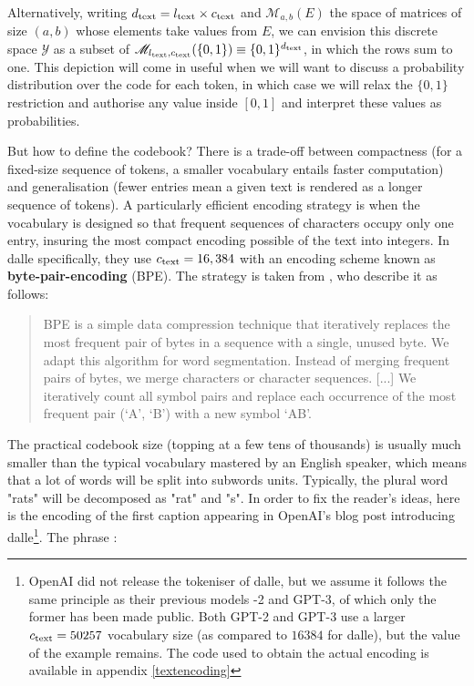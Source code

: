 \documentclass{article}
\begin{document}
\begin{multicols}{2}
Alternatively, writing ${d_{\mathrm{text}}} = {l_{\mathrm{text}}} \times {c_{\mathrm{text}}}$ and $\mathscr{M}_{a,b}(E)$ the space of matrices of size $(a,b)$ whose elements take values from $E$, we can envision this discrete space $\mathcal{Y}$ as a subset of $\mathscr{M}_{{l_{\mathrm{text}}},{c_{\mathrm{text}}}}(\{0,1\})\equiv \{0,1\}^{d_{\mathrm{text}}}$, in which the rows sum to one.
This depiction will come in useful when we will want to discuss a probability distribution over the code for each token, in which case we will relax the $\{0,1\}$ restriction and authorise any value inside $[0,1]$ and interpret these values as probabilities.

But how to define the codebook?
There is a trade-off between compactness (for a fixed-size sequence of tokens, a smaller vocabulary entails faster computation) and generalisation (fewer entries mean a given text is rendered as a longer sequence of tokens).
A particularly efficient encoding strategy is when the vocabulary is designed so that frequent sequences of characters occupy only one entry, insuring the most compact encoding possible of the text into integers.
In \gls{dalle} specifically, they use ${c_{\mathrm{text}}}=16,384$ with an encoding scheme known as \textbf{byte-pair-encoding} (BPE). The strategy is taken from \citet{subword-units}, who describe it as follows:

\blockquote{
BPE is a simple data compression technique that iteratively replaces the most frequent pair of bytes in a sequence with a single, unused byte.
We adapt this algorithm for word segmentation.
Instead of merging frequent pairs of bytes, we merge characters or character sequences.
[...]
We iteratively count all symbol pairs and replace each occurrence of the most frequent pair (‘A’, ‘B’) with a new symbol ‘AB’.
}

The practical codebook size (topping at a few tens of thousands) is usually much smaller than the typical vocabulary mastered by an English speaker, which means that a lot of words will be split into subwords units.
Typically, the plural word "rats" will be decomposed as "rat" and "s".
In order to fix the reader's ideas, here is the encoding of the first caption appearing in OpenAI's blog post introducing \gls{dalle}\footnote{OpenAI did not release the tokeniser of \gls{dalle}, but we assume it follows the same principle as their previous models -2 and GPT-3, of which only the former has been made public. Both GPT-2 and GPT-3 use a larger ${c_{\mathrm{text}}}=50257$ vocabulary size (as compared to $16384$ for \gls{dalle}), but the value of the example remains. The code used to obtain the actual encoding is available in appendix \ref{textencoding}}. The phrase :


\end{multicols}
\end{document}
